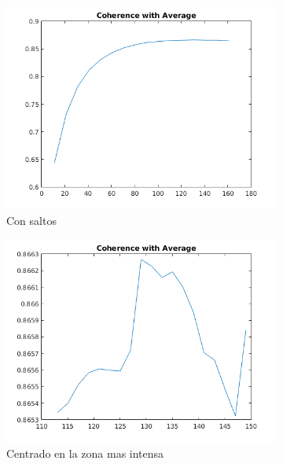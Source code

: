 \begin{figure}[H]
	\centering
	\begin{subfigure}[b]{0.48\textwidth}
        \includegraphics[width=1\textwidth]{./Figures/Results/coherenceWithAverageJump.png}
        \caption{Con saltos}
        \label{fig:thermalforanisodiffwithmediana}
  \end{subfigure}
  \begin{subfigure}[b]{0.48\textwidth}
        \includegraphics[width=1\textwidth]{./Figures/Results/coherenceWithAverageCentrado.png}
        \caption{Centrado en la zona mas intensa}
        \label{fig:thermalforanisodiffwithmedianacentered}
  \end{subfigure}
  \begin{subfigure}[b]{0.48\textwidth}

\end{subfigure}
\end{figure}
